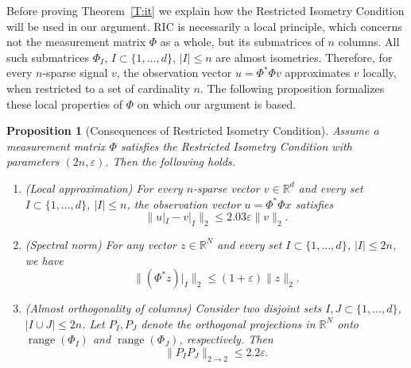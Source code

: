 \documentclass[12pt]{amsart}
\theoremstyle{plain}
\newtheorem{proposition}[theorem]{Proposition}
\theoremstyle{definition}
\theoremstyle{remark}
\numberwithin{equation}{section}
\begin{document}
\medskip

Before proving Theorem~\ref{T:it} we explain how the Restricted Isometry Condition 
will be used in our argument. RIC is necessarily a local principle, which concerns 
not the measurement matrix $\Phi$ as a whole, but its submatrices of $n$ columns. 
All such submatrices $\Phi_I$, $I \subset \{1,\ldots,d\}$, $|I| \le n$ are almost isometries.
Therefore, for every $n$-sparse signal $v$, the observation vector 
$u = \Phi^*\Phi v$ approximates $v$ locally, when restricted to a set of 
cardinality $n$. The following proposition formalizes these local properties
of $\Phi$ on which our argument is based.

\begin{proposition}[Consequences of Restricted Isometry Condition]\label{P:cons} 
  Assume a measurement matrix $\Phi$ satisfies the Restricted Isometry Condition 
  with parameters $(2n, {\varepsilon})$. Then the following holds.
  \begin{enumerate}
    \item {\em (Local approximation)} 
      For every $n$-sparse vector $v \in {\mathbb{R}}^d$ 
      and every set $I \subset \{1, \ldots, d\}$, $|I| \le n$, 
      the observation vector $u = \Phi^* \Phi x$ satisfies 
      $$
      \|u|_I - v|_I\|_2 \le 2.03 {\varepsilon} \|v\|_2.
      $$
    \item {\em (Spectral norm)} 
      For any vector $z \in {\mathbb{R}}^N$
      and every set $I \subset \{1, \ldots, d\}$, $|I| \le 2n$, we have 
      $$
      \|(\Phi^*z)|_I\|_2 \leq (1+{\varepsilon})\|z\|_2.
      $$
    \item {\em (Almost orthogonality of columns)} 
      Consider two disjoint sets $I,J \subset \{1, \ldots, d\}$, $|I \cup J| \le 2n$.
      Let $P_I, P_J$ denote the orthogonal projections in ${\mathbb{R}}^N$
      onto $\operatorname*{range}(\Phi_I)$ and $\operatorname*{range}(\Phi_J)$, respectively. Then 
      $$
      \|P_I P_J\|_{2\rightarrow 2} \leq 2.2 {\varepsilon}.
      $$
  \end{enumerate}
\end{proposition}
\end{document}
